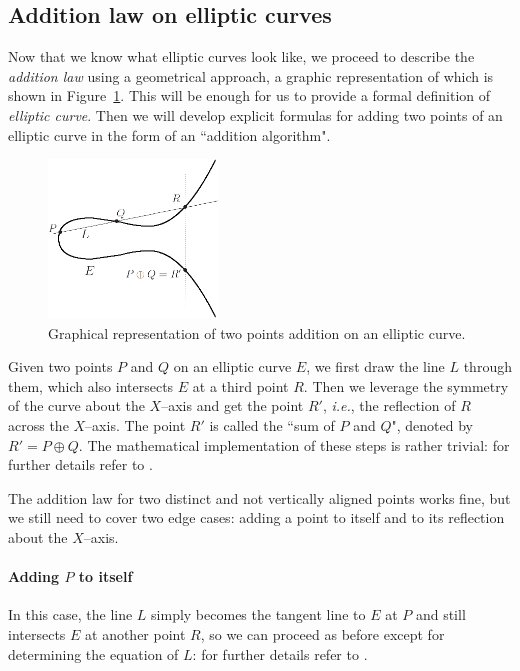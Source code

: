 \documentclass[9pt]{article}
\theoremstyle{definition}
\begin{document}
\subsection{Addition law on elliptic curves}
Now that we know what elliptic curves look like, we proceed to describe the \textit{addition law} using a geometrical approach, a graphic representation of which is shown in Figure~\ref{fig:addlaw}. This will be enough for us to provide a formal definition of \textit{elliptic curve}. Then we will develop explicit formulas for adding two points of an elliptic curve in the form of an ``addition algorithm".

\begin{figure}[h]
	\centering
	\includegraphics[width=0.4\textwidth]{addlaw.png}
	\caption{Graphical representation of two points addition on an elliptic curve.}
	\label{fig:addlaw}
\end{figure}

Given two points $P$ and $Q$ on an elliptic curve $E$, we first draw the line $L$ through them, which also intersects $E$ at a third point $R$. Then we leverage the symmetry of the curve about the $X$--axis and get the point $R'$, \textit{i.e.}, the reflection of $R$ across the $X$--axis. The point $R'$ is called the ``sum of $P$ and $Q$", denoted by $R' = P \oplus Q$. The mathematical implementation of these steps is rather trivial: for further details refer to \cite[Example~5.1]{JH08}.

The addition law for two distinct and not vertically aligned points works fine, but we still need to cover two edge cases: adding a point to itself and to its reflection about the $X$--axis.

\paragraph{Adding $P$ to itself}
In this case, the line $L$ simply becomes the tangent line to $E$ at $P$ and still intersects $E$ at another point $R$, so we can proceed as before except for determining the equation of $L$: for further details refer to \cite[Example~5.2]{JH08}.
\end{document}
